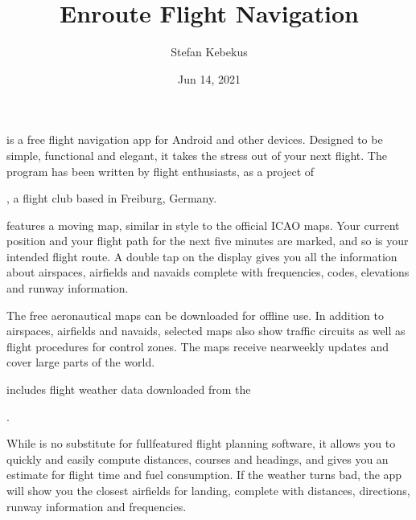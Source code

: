 \documentclass[letterpaper,10pt,english]{sphinxmanual}
\title{Enroute Flight Navigation}
\date{Jun 14, 2021}
\author{Stefan Kebekus}
\let\sphinxpxdimen\pdfpxdimen\else\newdimen\sphinxpxdimen
\begin{document}
\pagestyle{empty}
\sphinxmaketitle
\pagestyle{plain}
\sphinxtableofcontents
\pagestyle{normal}
\label{\detokenize{index::doc}}


\noindent{\hspace*{\fill}\sphinxincludegraphics[width=100\sphinxpxdimen]{{de.akaflieg_freiburg.enroute}.png}\hspace*{\fill}}

\sphinxAtStartPar
{} is a free flight navigation app for Android and
other devices.  Designed to be simple, functional and elegant, it takes the
stress out of your next flight. The program has been written by flight
enthusiasts, as a project of %
\begin{footnote}[1]\sphinxAtStartFootnote
{}
%
\end{footnote}, a flight club based in Freiburg, Germany.

\sphinxAtStartPar
{} features a moving map, similar in style to the
official ICAO maps. Your current position and your flight path for the next five
minutes are marked, and so is your intended flight route. A double tap on the
display gives you all the information about airspaces, airfields and navaids \textendash{}
complete with frequencies, codes, elevations and runway information.

\sphinxAtStartPar
The free aeronautical maps can be downloaded for offline use. In addition to
airspaces, airfields and navaids, selected maps also show traffic circuits as
well as flight procedures for control zones. The maps receive near\sphinxhyphen{}weekly
updates and cover large parts of the world.

\sphinxAtStartPar
{} includes flight weather data downloaded from the
%
\begin{footnote}[2]\sphinxAtStartFootnote
{}
%
\end{footnote}.

\sphinxAtStartPar
While  is no substitute for full\sphinxhyphen{}featured flight
planning software, it allows you to quickly and easily compute distances,
courses and headings, and gives you an estimate for flight time and fuel
consumption. If the weather turns bad, the app will show you the closest
airfields for landing, complete with distances, directions, runway information
and frequencies.
\end{document}
